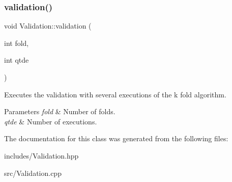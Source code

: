 \subsubsection{\texorpdfstring{validation()}{validation()}}
{\footnotesize\ttfamily void Validation\+::validation (\begin{DoxyParamCaption}\item[{int}]{fold,  }\item[{int}]{qtde }\end{DoxyParamCaption})}



Executes the validation with several executions of the k fold algorithm. 


\begin{DoxyParams}{Parameters}
{\em fold} & Number of folds. \\
\hline
{\em qtde} & Number of executions. \\
\hline
\end{DoxyParams}


The documentation for this class was generated from the following files\+:\begin{DoxyCompactItemize}
\item 
includes/Validation.\+hpp\item 
src/Validation.\+cpp\end{DoxyCompactItemize}
